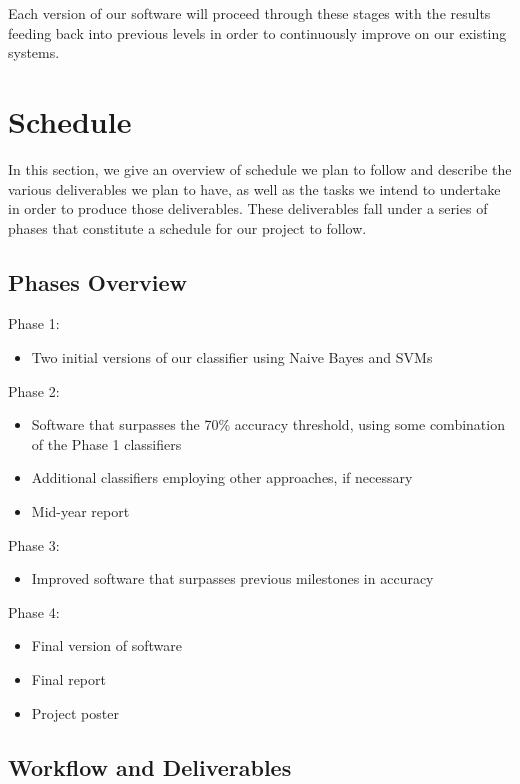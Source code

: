 \documentclass[cs,proposal]{hmcclinic}
\begin{document}
Each version of our software will proceed through these stages with the results feeding back into previous levels in order to continuously improve on our existing systems. 


\section{Schedule}

In this section, we give an overview of schedule we plan to follow and describe the various deliverables we plan to have, as well as the tasks we intend to undertake in order to produce those deliverables. These deliverables fall under a series of phases that constitute a schedule for our project to follow.

\subsection{Phases Overview}

Phase 1:
\begin{itemize} \itemsep0em
\item Two initial versions of our classifier using Naive Bayes and SVMs
\end{itemize}

\noindent Phase 2:
\begin{itemize} \itemsep0em
\item Software that surpasses the 70\% accuracy threshold, using some combination of the Phase 1 classifiers
\item Additional classifiers employing other approaches, if necessary
\item Mid-year report
\end{itemize}

\noindent Phase 3:
\begin{itemize} \itemsep0em
\item Improved software that surpasses previous milestones in accuracy
\end{itemize}

\noindent Phase 4:
\begin{itemize} \itemsep0em
\item Final version of software
\item Final report
\item Project poster
\end{itemize}

\subsection{Workflow and Deliverables}
\end{document}
